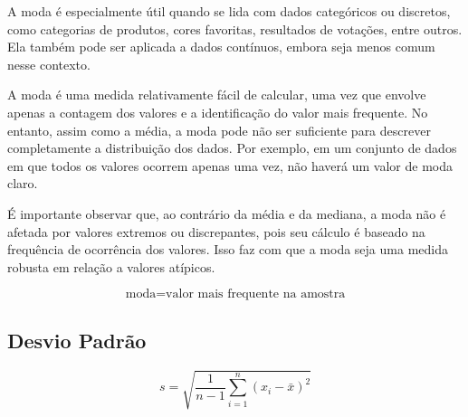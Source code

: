 A moda é especialmente útil quando se lida com dados categóricos ou discretos, como categorias de produtos, cores favoritas, resultados de votações, entre outros. Ela também pode ser aplicada a dados contínuos, embora seja menos comum nesse contexto.

A moda é uma medida relativamente fácil de calcular, uma vez que envolve apenas a contagem dos valores e a identificação do valor mais frequente. No entanto, assim como a média, a moda pode não ser suficiente para descrever completamente a distribuição dos dados. Por exemplo, em um conjunto de dados em que todos os valores ocorrem apenas uma vez, não haverá um valor de moda claro.

É importante observar que, ao contrário da média e da mediana, a moda não é afetada por valores extremos ou discrepantes, pois seu cálculo é baseado na frequência de ocorrência dos valores. Isso faz com que a moda seja uma medida robusta em relação a valores atípicos.

\[
\text{moda} = \text{valor mais frequente na amostra}
\]

\subsection{Desvio Padrão}



\[
s = \sqrt{\frac{1}{n-1} \sum_{i=1}^{n} (x_i - \bar{x})^2}
\]